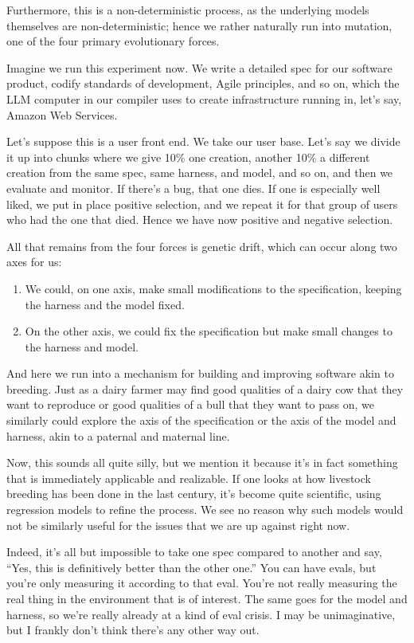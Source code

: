 \documentclass[12pt]{extarticle}
\begin{document}
Furthermore, this is a non-deterministic process, as the underlying models themselves are non-deterministic; hence we rather naturally run into mutation, one of the four primary evolutionary forces.

Imagine we run this experiment now. We write a detailed spec for our software product, codify standards of development, Agile principles, and so on, which the LLM computer in our compiler uses to create infrastructure running in, let's say, Amazon Web Services.

Let's suppose this is a user front end. We take our user base. Let's say we divide it up into chunks where we give 10\% one creation, another 10\% a different creation from the same spec, same harness, and model, and so on, and then we evaluate and monitor. If there's a bug, that one dies. If one is especially well liked, we put in place positive selection, and we repeat it for that group of users who had the one that died. Hence we have now positive and negative selection.

All that remains from the four forces is genetic drift, which can occur along two axes for us:
\begin{enumerate}
  \item We could, on one axis, make small modifications to the specification, keeping the harness and the model fixed.
  \item On the other axis, we could fix the specification but make small changes to the harness and model.
\end{enumerate}

And here we run into a mechanism for building and improving software akin to breeding. Just as a dairy farmer may find good qualities of a dairy cow that they want to reproduce or good qualities of a bull that they want to pass on, we similarly could explore the axis of the specification or the axis of the model and harness, akin to a paternal and maternal line.

Now, this sounds all quite silly, but we mention it because it's in fact something that is immediately applicable and realizable. If one looks at how livestock breeding has been done in the last century, it's become quite scientific, using regression models to refine the process. We see no reason why such models would not be similarly useful for the issues that we are up against right now.

Indeed, it's all but impossible to take one spec compared to another and say, ``Yes, this is definitively better than the other one.'' You can have evals, but you're only measuring it according to that eval. You're not really measuring the real thing in the environment that is of interest. The same goes for the model and harness, so we're really already at a kind of eval crisis. I may be unimaginative, but I frankly don't think there's any other way out.
\end{document}
